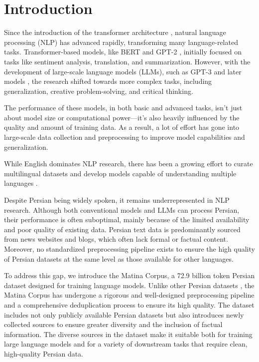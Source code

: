 \section{Introduction}
Since the introduction of the transformer architecture \citep{vaswani2017attention}, natural language processing (NLP) has advanced rapidly, transforming many language-related tasks. Transformer-based models, like BERT \citep{devlin2018bert} and GPT-2 \citep{radford2018improving}, initially focused on tasks like sentiment analysis, translation, and summarization. However, with the development of large-scale language models (LLMs), such as GPT-3 \citep{brown2020language} and later models \citep{touvron2023llama, le2023bloom, bai2023qwen, yang2024qwen2}, the research shifted towards more complex tasks, including generalization, creative problem-solving, and critical thinking.

The performance of these models, in both basic and advanced tasks, isn't just about model size or computational power—it's also heavily influenced by the quality and amount of training data. As a result, a lot of effort has gone into large-scale data collection and preprocessing \citep{gao2020pile, laurenccon2022roots, penedo2023refinedweb} to improve model capabilities and generalization.

While English dominates NLP research, there has been a growing effort to curate multilingual datasets \citep{wenzek2019ccnet, laurenccon2022roots, nguyen2023culturax, kudugunta2024madlad} and develop models capable of understanding multiple languages \citep{le2023bloom, touvron2023llama, yang2024qwen2}.

Despite Persian being widely spoken, it remains underrepresented in NLP research. Although both conventional models and LLMs can process Persian, their performance is often suboptimal, mainly because of the limited availability and poor quality of existing data. Persian text data is predominantly sourced from news websites and blogs, which often lack formal or factual content. Moreover, no standardized preprocessing pipeline exists to ensure the high quality of Persian datasets at the same level as those available for other languages.

To address this gap, we introduce the Matina Corpus, a 72.9 billion token Persian dataset designed for training language models. Unlike other Persian datasets \citep{targoman, sabeti2018mirastext}, the Matina Corpus has undergone a rigorous and well-designed preprocessing pipeline and a comprehensive deduplication process to ensure its high quality. The dataset includes not only publicly available Persian datasets but also introduces newly collected sources to ensure greater diversity and the inclusion of factual information. The diverse sources in the dataset make it suitable both for training large language models and for a variety of downstream tasks that require clean, high-quality Persian data.


